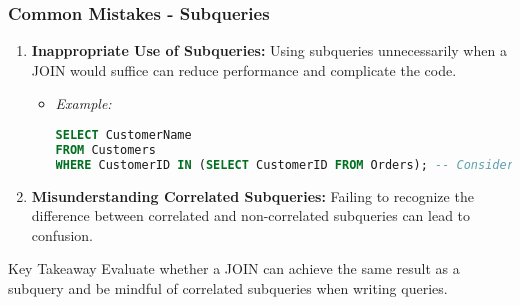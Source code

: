 \documentclass[aspectratio=169]{beamer}
\begin{document}
\begin{frame}[fragile]
    \frametitle{Common Mistakes - Subqueries}
    \begin{enumerate}
        \item \textbf{Inappropriate Use of Subqueries:} Using subqueries unnecessarily when a JOIN would suffice can reduce performance and complicate the code.
        \begin{itemize}
            \item \textit{Example:}
            \begin{lstlisting}[language=SQL]
SELECT CustomerName 
FROM Customers 
WHERE CustomerID IN (SELECT CustomerID FROM Orders); -- Consider using JOIN instead.
            \end{lstlisting}
        \end{itemize}

        \item \textbf{Misunderstanding Correlated Subqueries:} Failing to recognize the difference between correlated and non-correlated subqueries can lead to confusion.
    \end{enumerate}
    \begin{block}{Key Takeaway}
        Evaluate whether a JOIN can achieve the same result as a subquery and be mindful of correlated subqueries when writing queries.
    \end{block}
\end{frame}
\end{document}
